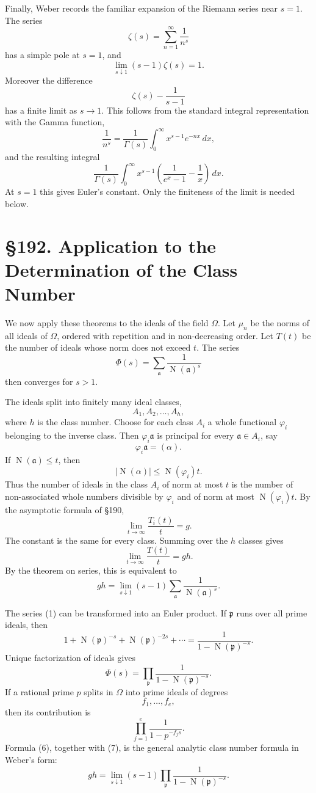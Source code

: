 \documentclass[12pt,a4paper]{article}
\newcommand{\webersection}[2]{\clearpage\section*{\S #1. #2}}
\newcommand{\idealp}{\mathfrak p}
\newcommand{\ideala}{\mathfrak a}
\newcommand{\N}{\operatorname{N}}
\begin{document}
Finally, Weber records the familiar expansion of the Riemann series near \(s=1\).  The series
\[
  \zeta(s)=\sum_{n=1}^{\infty}\frac1{n^s}
\]
has a simple pole at \(s=1\), and
\[
  \lim_{s\downarrow1}(s-1)\zeta(s)=1.
\tag{8}
\]
Moreover the difference
\[
  \zeta(s)-\frac1{s-1}
\]
has a finite limit as \(s\to1\).  This follows from the standard integral representation with the Gamma function,
\[
  \frac1{n^s}=\frac1{\Gamma(s)}\int_0^\infty x^{s-1}e^{-nx}\,dx,
\]
and the resulting integral
\[
  \frac1{\Gamma(s)}\int_0^\infty x^{s-1}
  \left(\frac1{e^x-1}-\frac1x\right)
  \,dx.
\]
At \(s=1\) this gives Euler's constant.  Only the finiteness of the limit is needed below.

\webersection{192}{Application to the Determination of the Class Number}

We now apply these theorems to the ideals of the field \(\Omega\).  Let \(\mu_n\) be the norms of all ideals of \(\Omega\), ordered with repetition and in non-decreasing order.  Let \(T(t)\) be the number of ideals whose norm does not exceed \(t\).  The series
\[
  \Phi(s)=\sum_{\ideala}\frac1{\N(\ideala)^s}
\tag{1}
\]
then converges for \(s>1\).

The ideals split into finitely many ideal classes,
\[
  A_1,A_2,
\ldots,A_h,
\]
where \(h\) is the class number.  Choose for each class \(A_i\) a whole functional \(\varphi_i\) belonging to the inverse class.  Then \(\varphi_i\ideala\) is principal for every \(\ideala\in A_i\), say
\[
  \varphi_i\ideala=(\alpha).
\tag{2}
\]
If \(\N(\ideala)
\le t\), then
\[
  |
\N(\alpha)|\le \N(\varphi_i)t.
\tag{3}
\]
Thus the number of ideals in the class \(A_i\) of norm at most \(t\) is the number of non-associated whole numbers divisible by \(\varphi_i\) and of norm at most \(\N(\varphi_i)t\).  By the asymptotic formula of \S190,
\[
  \lim_{t\to\infty}\frac{T_i(t)}{t}=g.
\tag{4}
\]
The constant is the same for every class.  Summing over the \(h\) classes gives
\[
  \lim_{t\to\infty}\frac{T(t)}{t}=gh.
\tag{5}
\]
By the theorem on series, this is equivalent to
\[
  gh=\lim_{s\downarrow1}(s-1)
  \sum_{\ideala}\frac1{\N(\ideala)^s}.
\tag{6}
\]

The series (1) can be transformed into an Euler product.  If \(\idealp\) runs over all prime ideals, then
\[
  1+\N(\idealp)^{-s}+\N(\idealp)^{-2s}+\cdots
  =\frac1{1-\N(\idealp)^{-s}}.
\]
Unique factorization of ideals gives
\[
  \Phi(s)=\prod_{\idealp}
  \frac1{1-\N(\idealp)^{-s}}.
\tag{7}
\]
If a rational prime \(p\) splits in \(\Omega\) into prime ideals of degrees
\[
  f_1,
\ldots,f_e,
\]
then its contribution is
\[
  \prod_{j=1}^{e}\frac1{1-p^{-f_j s}}.
\tag{8}
\]
Formula (6), together with (7), is the general analytic class number formula in Weber's form:
\[
  gh=\lim_{s\downarrow1}(s-1)
  \prod_{\idealp}
  \frac1{1-\N(\idealp)^{-s}}.
\tag{9}
\]
\end{document}
